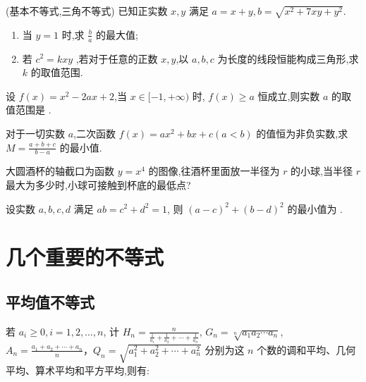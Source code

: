 \documentclass[a4paper , final]{ctexart}
\newenvironment{problem}[1]{%
  \item #1
  \par
  \vspace{8cm}
}{}
\begin{document}
\begin{problems}
  \begin{problem}
    {(基本不等式,三角不等式)
      已知正实数 $x,y$ 满足 $a=x+y,b=\sqrt{x^2+7xy+y^2}$.
      \begin{enumerate}[label=(\arabic*)]
        \item 当 $y=1$ 时,求 $\frac{b}{a}$ 的最大值;
        \item 若 $c^2=kxy$ ,若对于任意的正数 $x,y$,以 $a,b,c$ 为长度的线段恒能构成三角形,求 $k$ 的取值范围.
      \end{enumerate}
    }
  \end{problem}

  \begin{problem}
    {
      设 $f(x)=x^2-2ax+2$,当 $x\in[-1,+\infty)$ 时, $f(x)\geq a$ 恒成立,则实数 $a$ 的取值范围是 \underline{\hspace{3cm}}.
    }
  \end{problem}

  \begin{problem}
    {
      对于一切实数 $a$,二次函数 $f(x)=ax^2+bx+c(a<b)$ 的值恒为非负实数,求 $M=\frac{a+b+c}{b-a}$ 的最小值.   
    }
  \end{problem}
  
  \begin{problem}
    {
      大圆酒杯的轴截口为函数 $y=x^4$ 的图像,往酒杯里面放一半径为 $r$ 的小球,当半径 $r$ 最大为多少时,小球可接触到杯底的最低点?
    }
  \end{problem}

  \begin{problem}
    {
      设实数 $a,b,c,d$ 满足 $ab=c^2+d^2=1$, 则 $(a-c)^2+(b-d)^2$ 的最小值为 \underline{\hspace{3cm}}.
    }
  \end{problem}
\end{problems}

\section*{几个重要的不等式}

\subsection*{平均值不等式}


若 $a_i \ge 0,i=1,2,\ldots,n$, 计 $H_n =\frac{n}{\frac{1}{a_1}+\frac{1}{a_2}+\cdots+\frac{1}{a_n}}$, $G_n = \sqrt[n]{a_1 a_2 \cdots a_n}$, $A_n = \frac{a_1+a_2+\cdots+a_n}{n}$，$Q_n = \sqrt{a_1^2+a_2^2+\cdots+a_n^2}$ 分别为这 $n$ 个数的调和平均、几何平均、算术平均和平方平均,则有:
\end{document}
